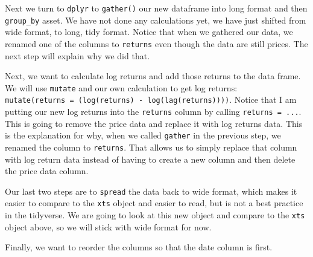 \documentclass[]{krantz}
\makeatletter
\newenvironment{Shaded}{\begin{snugshade}}{\end{snugshade}}
\newcommand{\KeywordTok}[1]{\textcolor[rgb]{0.13,0.29,0.53}{\textbf{#1}}}
\newcommand{\DataTypeTok}[1]{\textcolor[rgb]{0.13,0.29,0.53}{#1}}
\newcommand{\StringTok}[1]{\textcolor[rgb]{0.31,0.60,0.02}{#1}}
\newcommand{\OtherTok}[1]{\textcolor[rgb]{0.56,0.35,0.01}{#1}}
\newcommand{\OperatorTok}[1]{\textcolor[rgb]{0.81,0.36,0.00}{\textbf{#1}}}
\newcommand{\NormalTok}[1]{#1}
\newenvironment{kframe}{%
\medskip{}
\setlength{\fboxsep}{.8em}
 \def\at@end@of@kframe{}%
 \ifinner\ifhmode%
  \def\at@end@of@kframe{\end{minipage}}%
  \begin{minipage}{\columnwidth}%
 \fi\fi%
 \def\FrameCommand##1{\hskip\@totalleftmargin \hskip-\fboxsep
 \colorbox{shadecolor}{##1}\hskip-\fboxsep
     \hskip-\linewidth \hskip-\@totalleftmargin \hskip\columnwidth}%
 \MakeFramed {\advance\hsize-\width
   \@totalleftmargin\z@ \linewidth\hsize
   \@setminipage}}%
 {\par\unskip\endMakeFramed%
 \at@end@of@kframe}
\renewenvironment{Shaded}{\begin{kframe}}{\end{kframe}}
\makeatother
\begin{document}
Next we turn to \texttt{dplyr} to \texttt{gather()} our new dataframe
into long format and then \texttt{group\_by} asset. We have not done any
calculations yet, we have just shifted from wide format, to long, tidy
format. Notice that when we gathered our data, we renamed one of the
columns to \texttt{returns} even though the data are still prices. The
next step will explain why we did that.

Next, we want to calculate log returns and add those returns to the data
frame. We will use \texttt{mutate} and our own calculation to get log
returns:
\texttt{mutate(returns\ =\ (log(returns)\ -\ log(lag(returns))))}.
Notice that I am putting our new log returns into the \texttt{returns}
column by calling \texttt{returns\ =\ ...}. This is going to remove the
price data and replace it with log returns data. This is the explanation
for why, when we called \texttt{gather} in the previous step, we renamed
the column to \texttt{returns}. That allows us to simply replace that
column with log return data instead of having to create a new column and
then delete the price data column.

Our last two steps are to \texttt{spread} the data back to wide format,
which makes it easier to compare to the \texttt{xts} object and easier
to read, but is not a best practice in the tidyverse. We are going to
look at this new object and compare to the \texttt{xts} object above, so
we will stick with wide format for now.

Finally, we want to reorder the columns so that the date column is
first.

\begin{Shaded}
\end{Shaded}
\end{document}
